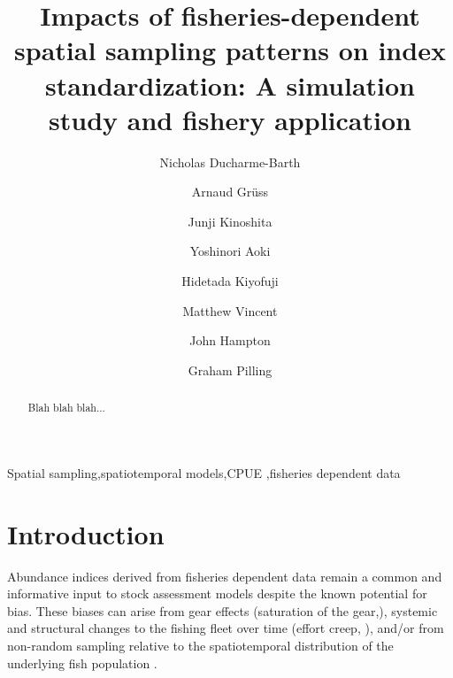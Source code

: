 \documentclass[authoryear,preprint,review,12pt]{elsarticle}
\begin{document}
\begin{frontmatter}

\title{Impacts of fisheries-dependent spatial sampling patterns on index standardization: A simulation study and fishery application}


\author[address.1]{Nicholas Ducharme-Barth}
\author[address.2]{Arnaud Gr\"uss}
\author[address.3]{Junji Kinoshita}
\author[address.4]{Yoshinori Aoki}
\author[address.4]{Hidetada Kiyofuji}
\author[address.1]{Matthew Vincent}
\author[address.1]{John Hampton}
\author[address.1]{Graham Pilling}

\address[address.1]{Pacific Community, B.P. D5 98848 Noumea, New Caledonia}
\address[address.2]{School of Aquatic and Fishery Sciences, University of Washington, Box 355020, Seattle, WA, 98105-5020, USA}
\address[address.3]{National Research Institute of Far Seas Fisheries, Japan Fisheries Research and Education Agency, Yokohama, Kanagawa, Japan}
\address[address.4]{National Research Institute of Far Seas Fisheries, Japan Fisheries Research and Education Agency, Shimizu-ku, Shizuoka-shi, Shizuoka 424-8633 Japan}

\begin{abstract}
Blah blah blah...
\end{abstract}

\begin{keyword}
Spatial sampling\sep spatiotemporal models\sep CPUE \sep fisheries dependent data
\end{keyword}

\end{frontmatter}

\linenumbers

\section{Introduction}\label{Intro}
Abundance indices derived from fisheries dependent data remain a common and informative input to stock assessment models despite the known potential for bias. These biases can arise from gear effects (saturation of the gear,\citet{deriso_odds_1987}), systemic and structural changes to the fishing fleet over time (effort creep, \citet{bishop_analysing_2004,ye_how_2009}), and/or from non-random sampling relative to the spatiotemporal distribution of the underlying fish population \citep{clark_aggregation_1979, rose_effects_1991, rose_hyperaggregation_1999,swain_fish_1994}. 
\end{document}
